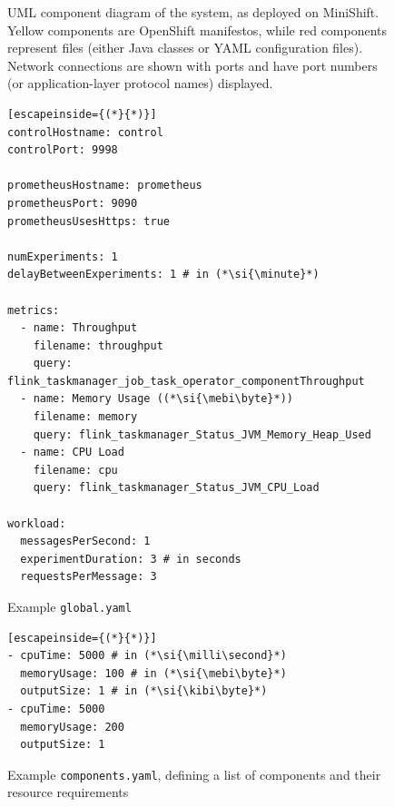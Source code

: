 \documentclass{article}
\begin{document}
\begin{figure}
  \caption{UML component diagram of the system, as deployed on MiniShift. Yellow
  components are OpenShift manifestos, while red components represent files
  (either Java classes or YAML configuration files). Network connections are
  shown with ports and have port numbers (or application-layer protocol names)
  displayed.}
  \label{fig:uml}
\end{figure}

\begin{figure}
  \centering
\begin{lstlisting}[escapeinside={(*}{*)}]
controlHostname: control
controlPort: 9998

prometheusHostname: prometheus
prometheusPort: 9090
prometheusUsesHttps: true

numExperiments: 1
delayBetweenExperiments: 1 # in (*\si{\minute}*)

metrics:
  - name: Throughput
    filename: throughput
    query: flink_taskmanager_job_task_operator_componentThroughput
  - name: Memory Usage ((*\si{\mebi\byte}*))
    filename: memory
    query: flink_taskmanager_Status_JVM_Memory_Heap_Used
  - name: CPU Load
    filename: cpu
    query: flink_taskmanager_Status_JVM_CPU_Load

workload:
  messagesPerSecond: 1
  experimentDuration: 3 # in seconds
  requestsPerMessage: 3
\end{lstlisting}
  \caption{Example \texttt{global.yaml}}
  \label{fig:global}
\end{figure}

\begin{figure}
  \centering
\begin{lstlisting}[escapeinside={(*}{*)}]
- cpuTime: 5000 # in (*\si{\milli\second}*)
  memoryUsage: 100 # in (*\si{\mebi\byte}*)
  outputSize: 1 # in (*\si{\kibi\byte}*)
- cpuTime: 5000
  memoryUsage: 200
  outputSize: 1
\end{lstlisting}
  \caption{Example \texttt{components.yaml}, defining a list of components and
    their resource requirements}
  \label{fig:components}
\end{figure}
\end{document}
